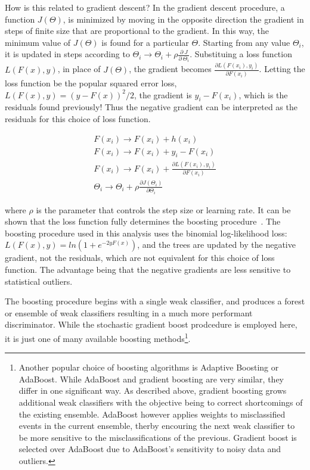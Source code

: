 How is this related to gradient descent? In the gradient descent procedure, a function $J(\Theta)$, is minimized by moving in the opposite direction the gradient in steps
of finite size that are proportional to the gradient. In this way, the minimum value of $J(\Theta)$ is found for a particular $\Theta$. Starting from any value $\Theta_{i}$,
it is updated in steps according to $\Theta_{i} \rightarrow \Theta_{i} + \rho\frac{\partial~J}{\partial~\Theta_{i}}$. 
Substituing a loss function $L(F(x),y)$, in place of $J(\Theta)$, the gradient becomes $\frac{\partial L(F(x_{i}),y_{i})}{\partial F(x_{i})}$. Letting the loss function be the popular squared error loss,
$L(F(x),y) = (y-F(x))^{2}/2$, the gradient is $y_{i}-F(x_{i})$, which is the residuals found previously! Thus the negative gradient can be interpreted as the residuals for this
choice of loss function. 

\begin{equation}
\begin{aligned}
\label{eqn:residual1}
F(x_{i}) \rightarrow F(x_{i}) + h(x_{i}) \\ F(x_{i}) \rightarrow F(x_{i}) + y_{i} - F(x_{i}) \\ F(x_{i}) \rightarrow F(x_{i}) + \frac{\partial L(F(x_{i}),y_{i})}{\partial F(x_{i})} \\ \Theta_{i} \rightarrow \Theta_{i} + \rho\frac{\partial J(\Theta_{i})}{\partial \Theta_{i}}
\end{aligned} 
\end{equation}

\noindent where $\rho$ is the parameter that controls the step size or learning rate. It can be shown that the loss function fully determines the boosting procedure~\cite{tmva}.
The boosting procedure used in this analysis uses the binomial log-likelihood loss: $L(F(x),y) = ln(1+e^{-2yF(x)})$, and the trees are updated by the negative gradient,
not the residuals, which are not equivalent for this choice of loss function. The advantage being that the negative gradients are less sensitive to statistical outliers. 

The boosting procedure begins with a single weak classifier, and produces a forest or ensemble of weak classifiers resulting in a much more performant discriminator.
While the stochastic gradient boost prodcedure is employed here, it is just one of many available boosting methods\footnote{Another popular choice of boosting algorithms
is Adaptive Boosting or AdaBoost. While AdaBoost and
gradient boosting are very similar, they differ in one significant way. As described above, gradient boosting grows additional weak classifiers with the objective being to correct
shortcomings of the existing ensemble. AdaBoost however applies weights to misclassified events in the current ensemble, therby encouring the next weak classifier to be more sensitive
to the misclassifications of the previous. Gradient boost is selected over AdaBoost due to AdaBoost's sensitivity to noisy data and outliers.}.

